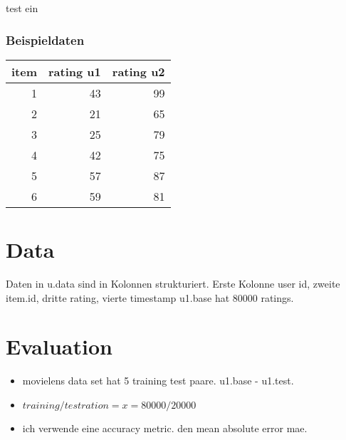 \documentclass[11pt]{article}
\begin{document}
test ein 

\subsubsection{Beispieldaten}
\label{sec-2-1-3}

\begin{center}
\begin{tabular}{rrr}
 item  &  rating u1  &  rating u2  \\
\hline
    1  &         43  &         99  \\
    2  &         21  &         65  \\
    3  &         25  &         79  \\
    4  &         42  &         75  \\
    5  &         57  &         87  \\
    6  &         59  &         81  \\
\end{tabular}
\end{center}

\section{Data}
\label{sec-3}

Daten in u.data sind in Kolonnen strukturiert. 
Erste Kolonne user id, zweite item.id, dritte rating, vierte timestamp
u1.base hat 80000 ratings.
\section{Evaluation}
\label{sec-4}

\begin{itemize}
\item movielens data set hat 5 training test paare. u1.base - u1.test.
\item $training/test ration = x = 80000/20000$
\item ich verwende eine accuracy metric. den mean absolute error mae.
\end{itemize}
\end{document}
